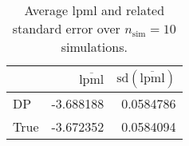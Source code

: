\begin{table}[H]

\caption{Average lpml and related standard error over $n_{\text{sim}} = 10$ simulations.}
\centering
\begin{tabular}[t]{lrr}
\toprule
  & $\overbar{\text{lpml}}$ & $\text{sd}(\overbar{\text{lpml}})$\\
\midrule
DP & -3.688188 & 0.0584786\\
True & -3.672352 & 0.0584094\\
\bottomrule
\end{tabular}
\end{table}